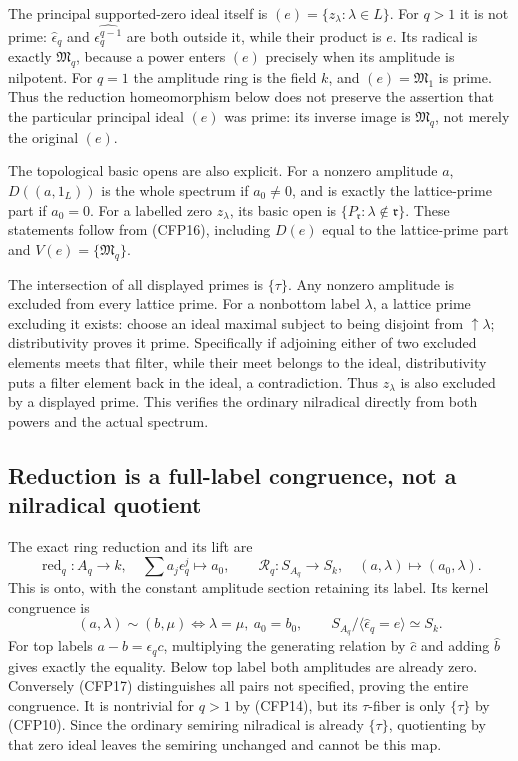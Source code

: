 The principal supported-zero ideal itself is
$(e)=\{z_\lambda:\lambda\in L\}$. For $q>1$
it is not prime: $\widehat\epsilon_q$ and
$\widehat{\epsilon_q^{q-1}}$ are both outside
it, while their product is $e$. Its radical
is exactly $\mathfrak M_q$, because a power
enters $(e)$ precisely when its amplitude
is nilpotent. For $q=1$ the amplitude ring
is the field $k$, and $(e)=\mathfrak M_1$
is prime. Thus the reduction homeomorphism
below does not preserve the assertion that
the particular principal ideal $(e)$ was
prime: its inverse image is $\mathfrak M_q$,
not merely the original $(e)$.

The topological basic opens are also explicit.
For a nonzero amplitude $a$, $D((a,1_L))$ is
the whole spectrum if $a_0\ne0$, and is exactly
the lattice-prime part if $a_0=0$. For a labelled
zero $z_\lambda$, its basic open is
$\{P_{\mathfrak r}:\lambda\notin\mathfrak r\}$.
These statements follow from (CFP16), including
$D(e)$ equal to the lattice-prime part and
$V(e)=\{\mathfrak M_q\}$.

The intersection of all displayed primes is
$\{\tau\}$. Any nonzero amplitude is excluded
from every lattice prime. For a nonbottom label
$\lambda$, a lattice prime excluding it exists:
choose an ideal maximal subject to being disjoint
from $\uparrow\lambda$; distributivity proves it
prime. Specifically if adjoining either of two
excluded elements meets that filter, while their
meet belongs to the ideal, distributivity puts a
filter element back in the ideal, a contradiction.
Thus $z_\lambda$ is also excluded by a displayed
prime. This verifies the ordinary nilradical
directly from both powers and the actual spectrum.

\subsection{Reduction is a full-label congruence, not a nilradical quotient}

The exact ring reduction and its lift are
\begin{equation}\tag{CFP17}
 \operatorname{red}_q:A_q\to k,\quad
             \sum a_j\epsilon_q^j\longmapsto a_0,
 \qquad
 \mathcal R_q:S_{A_q}\to S_k,\quad
             (a,\lambda)\longmapsto(a_0,\lambda).
\end{equation}
This is onto, with the constant amplitude section
retaining its label. Its kernel congruence is
\begin{equation}\tag{CFP18}
 (a,\lambda)\sim(b,\mu)
      \Longleftrightarrow\lambda=\mu,\ a_0=b_0,
 \qquad
 S_{A_q}/\langle\widehat\epsilon_q=e\rangle\simeq S_k.
\end{equation}
For top labels $a-b=\epsilon_q c$,
multiplying the generating relation by $\widehat c$
and adding $\widehat b$ gives exactly the equality.
Below top label both amplitudes are already zero.
Conversely (CFP17) distinguishes all pairs not
specified, proving the entire congruence.
It is nontrivial for $q>1$ by (CFP14), but its
$\tau$-fiber is only $\{\tau\}$ by (CFP10).
Since the ordinary semiring nilradical is already
$\{\tau\}$, quotienting by that zero ideal leaves
the semiring unchanged and cannot be this map.

